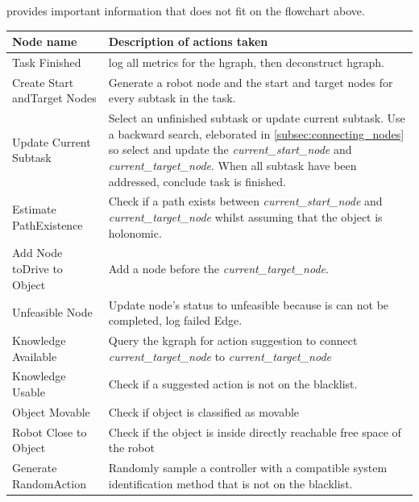 

 provides important information that does not fit on the flowchart above.


\begin{table}[H]
\centering
{}
\begin{tabular}[t]{>{\raggedright}p{3.5cm}>{\raggedright\arraybackslash}p{10.5cm}}
  \textbf{Node name} & \textbf{Description of actions taken}\\\toprule
  Task Finished & log all metrics for the \ac{hgraph}, then deconstruct \ac{hgraph}.\\
  Create Start and\newline Target Nodes & Generate a robot node and the start and target nodes for every subtask in the task.\\
Update Current Subtask & Select an unfinished subtask or update current subtask. Use a backward search, eleborated in \cref{subsec:connecting_nodes} so select and update the \textit{current\_start\_node} and \textit{current\_target\_node}. When all subtask have been addressed, conclude task is finished. \\
Estimate Path\newline Existence & Check if a path exists between \textit{current\_start\_node} and \textit{current\_target\_node} whilst assuming that the object is holonomic.\\
Add Node to\newline Drive to Object & Add a node before the \textit{current\_target\_node}.\\
Unfeasible Node & Update node's status to unfeasible because is can not be completed, log failed Edge.\\
Knowledge Available& Query the \ac{kgraph} for action suggestion to connect \textit{current\_target\_node} to \textit{current\_target\_node}\\
Knowledge Usable& Check if a suggested action is not on the blacklist.\\
Object Movable & Check if object is classified as movable\\
Robot Close to Object& Check if the object is inside directly reachable free space of the robot \\
Generate Random\newline Action& Randomly sample a controller with a compatible system identification method that is not on the blacklist. \\

\end{tabular}
\end{table}
